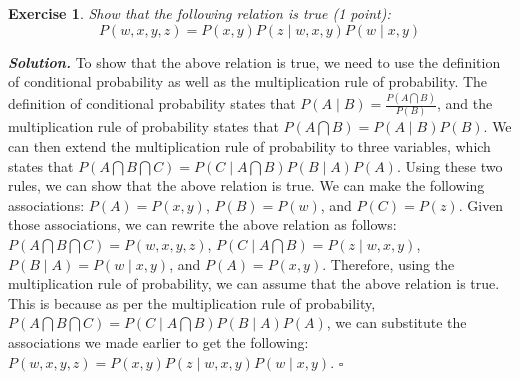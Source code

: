 \documentclass[12pt]{article}
\newtheorem{exercise}{Exercise}
\newenvironment{solution}[1][\it{Solution}]{\textbf{#1. } }{$\square$}
\begin{document}
\begin{exercise}
Show that the following relation is true (1 point):
\begin{equation}
P(w, x, y, z) = P(x, y)P(z \mid w, x, y)P(w \mid x, y)
\end{equation}
\end{exercise}
\begin{solution}
To show that the above relation is true, we need to use the definition of conditional probability as well as the multiplication rule of probability. 
The definition of conditional probability states that $P(A \mid B) = \frac{P(A \bigcap B)}{P(B)}$, and the multiplication rule of probability states that $P(A \bigcap B) = P(A \mid B)P(B)$. 
We can then extend the multiplication rule of probability to three variables, which states that 
$P(A \bigcap B \bigcap C) = P(C \mid A \bigcap B)P(B \mid A)P(A)$.
Using these two rules, we can show that the above relation is true. We can make the following associations:  
$P(A) = P(x, y)$, $P(B) = P(w)$, and $P(C) = P(z)$.
Given those associations, we can rewrite the above relation as follows: 
$P(A \bigcap B \bigcap C) = P(w, x, y, z)$, $P(C \mid A \bigcap B) = P(z \mid w, x, y)$, $P(B \mid A) = P(w \mid x, y)$, and $P(A) = P(x, y)$.
Therefore, using the multiplication rule of probability, we can assume that the above relation is true. 
This is because as per the multiplication rule of probability, 
$P(A \bigcap B \bigcap C) = P(C \mid A \bigcap B)P(B \mid A)P(A)$, we can substitute the associations we made earlier to get the following:
$P(w, x, y, z) = P(x, y)P(z \mid w, x, y)P(w \mid x, y)$.
\end{solution}
\end{document}
